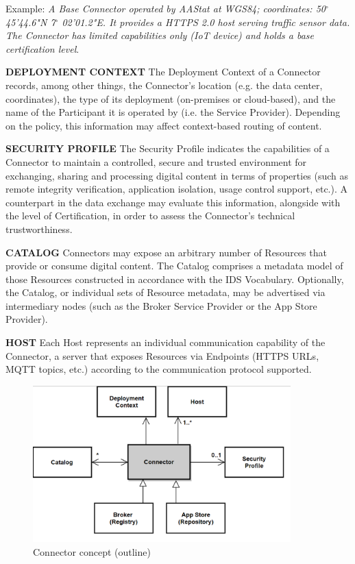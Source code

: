 Example: \textit{A Base Connector operated by AAStat at WGS84; coordinates: 50$ ^{\circ} $ 45'44.6"N 7$ ^{\circ} $ 02'01.2"E. It provides a HTTPS 2.0 host serving traffic sensor data. The Connector has limited capabilities only (IoT device) and holds a base certification level}. 

\textbf{DEPLOYMENT CONTEXT }The Deployment Context of a Connector records, among other things, the Connector’s location (e.g. the data center, coordinates), the type of its deployment (on-premises or cloud-based), and the name of the Participant it is operated by (i.e. the Service Provider). Depending on the policy, this information may affect context-based routing of content. 

\textbf{SECURITY PROFILE} The Security Profile indicates the capabilities of a Connector to maintain a controlled, secure and trusted environment for exchanging, sharing and processing digital content in terms of properties (such as remote integrity verification, application isolation, usage control support, etc.). A counterpart in the data exchange may evaluate this information, alongside with the level of Certification, in order to assess the Connector’s technical trustworthiness. 

\textbf{CATALOG} Connectors may expose an arbitrary number of Resources that provide or consume digital content. The Catalog comprises a metadata model of those Resources constructed in accordance with the IDS Vocabulary. Optionally, the Catalog, or individual sets of Resource metadata, may be advertised via intermediary nodes (such as the Broker Service Provider or the App Store Provider).

\textbf{HOST} Each Host represents an individual communication capability of the Connector, a server that exposes Resources via Endpoints (HTTPS URLs, MQTT topics, etc.) according to the communication protocol supported.




\begin{figure}[H]
	\begin{Center}
		\includegraphics[width=3.92in,height=2.38in]{./media/image50.png}
		\caption{Connector concept (outline)}
		\label{fig:Connector_concept_outline}
	\end{Center}
\end{figure}


